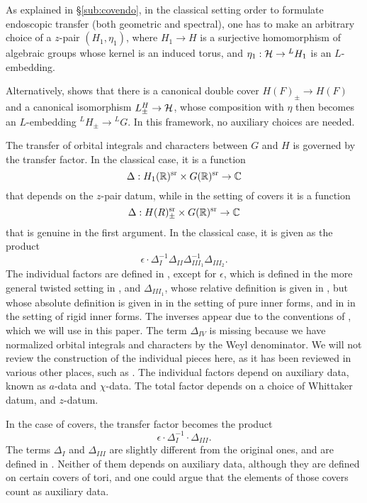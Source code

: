 \documentclass{article}
\theoremstyle{definition}
\numberwithin{equation}{section}
\renewcommand{\-}{\hyp{}}
\begin{document}
As explained in \S\ref{sub:covendo}, in the classical setting order to formulate endoscopic transfer (both geometric and spectral), one has to make an arbitrary choice of a $z$-pair $(H_1,\eta_1)$, where $H_1 \to H$ is a surjective homomorphism of algebraic groups whose kernel is an induced torus, and $\eta_1 : \mathcal{H} \to {^LH_1}$ is an $L$\-embedding. 

Alternatively, \cite{KalHDC} shows that there is a canonical double cover $H(F)_\pm \to H(F)$ and a canonical isomorphism $L^H_\pm \to \mathcal{H}$, whose composition with $\eta$ then becomes an $L$\-embedding $^LH_\pm \to {^LG}$. In this framework, no auxiliary choices are needed.

The transfer of orbital integrals and characters between $G$ and $H$ is governed by the transfer factor. In the classical case, it is a function
\[ \Delta : H_1(\mathbb{R})^{\textrm{sr}} \times G(\mathbb{R})^{\textrm{sr}} \to \mathbb{C} \]
that depends on the $z$-pair datum, while in the setting of covers it is a function
\[ \Delta : H(R)_\pm^{\textrm{sr}} \times G(\mathbb{R})^{\textrm{sr}} \to \mathbb{C} \]
that is genuine in the first argument. In the classical case, it is given as the product
\[ \epsilon \cdot \Delta_I^{-1}\Delta_{II}\Delta_{III_1}^{-1}\Delta_{III_2}. \]
The individual factors are defined in \cite{LS87}, except for $\epsilon$, which is defined in the more general twisted setting in \cite[\S5.3]{KS99}, and $\Delta_{III_1}$, whose relative definition is given in \cite{LS87}, but whose absolute definition is given in \cite{KalECI} in the setting of pure inner forms, and in \cite{KalRI} in the setting of rigid inner forms. The inverses appear due to the conventions of \cite[(1.0.4)]{KS12}, which we will use in this paper. The term $\Delta_{IV}$ is missing because we have normalized orbital integrals and characters by the Weyl denominator. We will not review the construction of the individual pieces here, as it has been reviewed in various other places, such as \cite[\S3.5,\S4.2,\S4.3]{KalIMS}. The individual factors depend on auxiliary data, known as $a$-data and $\chi$-data. The total factor depends on a choice of Whittaker datum, and $z$-datum.

In the case of covers, the transfer factor becomes the product
\[ \epsilon \cdot \Delta_I^{-1} \cdot \Delta_{III}.\]
The terms $\Delta_I$ and $\Delta_{III}$ are slightly different from the original ones, and are defined in \cite[\S4.3]{KalHDC}. Neither of them depends on auxiliary data, although they are defined on certain covers of tori, and one could argue that the elements of those covers count as auxiliary data.
\end{document}
